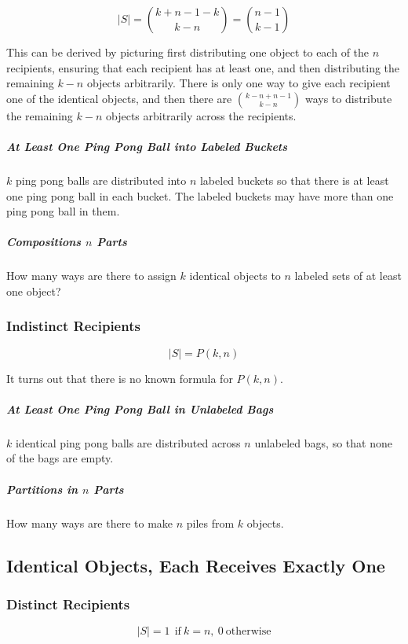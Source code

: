 \begin{equation}
|S| = {k+n-1-k \choose k-n}= {n-1 \choose k-1}
\end{equation}

This can be derived by picturing first distributing one object to each of the $n$ recipients, ensuring that each recipient has at least one, and then distributing the remaining $k-n$ objects arbitrarily. There is only one way to give each recipient one of the identical objects, and then there are ${k-n+n-1\choose k-n}$ ways to distribute the remaining $k-n$ objects arbitrarily across the recipients.

\subparagraph{At Least One Ping Pong Ball into Labeled Buckets} $k$ ping pong balls are distributed into $n$ labeled buckets so that there is at least one ping pong ball in each bucket. The labeled buckets may have more than one ping pong ball in them.

\subparagraph{Compositions $n$ Parts} How many ways are there to assign $k$ identical objects to $n$ labeled sets of at least one object?

\subsubsection{Indistinct Recipients}

\begin{equation}
|S| = P(k,n)
\end{equation}

It turns out that there is no known formula for $P(k,n)$.

\subparagraph{At Least One Ping Pong Ball in Unlabeled Bags} $k$ identical ping pong balls are distributed across $n$ unlabeled bags, so that none of the bags are empty. 

\subparagraph{Partitions in $n$ Parts} How many ways are there to make $n$ piles from $k$ objects.



\subsection{Identical Objects, Each Receives Exactly One}

\subsubsection{Distinct Recipients}

\begin{equation}
|S| = 1\ \ \mathrm{if\ }k = n,\ 0\ \mathrm{otherwise}
\end{equation}  

